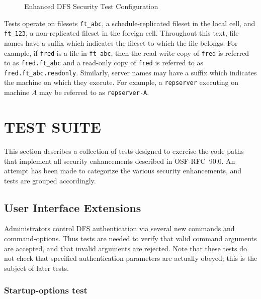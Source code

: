 \begin{figure} [b]
\begin{center}
\leavevmode{}
\caption{Enhanced DFS Security Test Configuration}
\label{fig:config}
\end{center}
\end{figure}

Tests operate on filesets
{\tt ft\_abc}, a schedule-replicated fileset in the local cell,
and {\tt ft\_123}, a non-replicated fileset in the foreign cell.
Throughout this text, file names have a suffix which indicates the
fileset to which the file belongs.  For example, if {\tt fred} is
a file in {\tt ft\_abc}, then the read-write copy of {\tt fred} is
referred to as {\tt fred.ft\_abc} and a read-only copy of {\tt fred} is
referred to as {\tt fred.ft\_abc.readonly}.  Similarly, server names
may have a suffix which indicates the machine on which they execute.
For example, a {\tt repserver} executing on machine $A$ may be
referred to as {\tt repserver-A}.


%
%

\section{TEST SUITE}
\label{sec:suite}

This section describes a collection of tests designed to exercise
the code paths that implement all security enhancements described
in OSF-RFC~90.0.  An attempt has been made to categorize the various
security enhancements, and tests are grouped accordingly.

\subsection{User Interface Extensions}

\begin{sloppypar}
Administrators control DFS authentication via several new
commands and command-options.  Thus tests are needed to verify that
valid command arguments are accepted, and that invalid arguments are
rejected.  Note that these tests do not check that specified
authentication parameters are actually obeyed; this is the subject of
later tests.
\end{sloppypar}

\subsubsection{Startup-options test}

